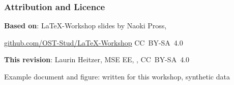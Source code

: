 \begin{frame}
    \frametitle{Attribution and Licence}
    \begin{center}
        \begin{minipage}{.8\textwidth}
            \textbf{Based on}:
            LaTeX-Workshop slides by Naoki Pross, 
            
            \href{https://github.com/OST-Stud/LaTeX-Workshop}{github.com/OST-Stud/LaTeX-Workshop} CC~BY-SA~4.0

            \bigskip
            \textbf{This revision}: Laurin Heitzer, MSE EE, \the\year, CC~BY-SA~4.0

            \bigskip
            {\small\color{black!60}
            Example document and figure: written for this workshop, synthetic data\par}
        \end{minipage}
    \end{center}
\end{frame}
